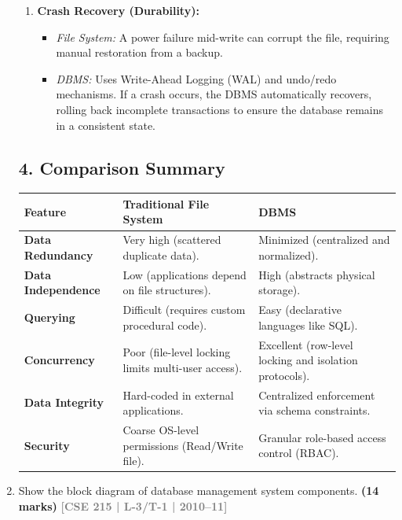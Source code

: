 \documentclass[12pt,a3paper]{article}
\newcommand{\yr}[1]{\hfill\textcolor{gray}{\small\textbf{[#1]}}}
\newcommand{\mk}[1]{\textcolor{orange!70!black}{\small\textbf{(#1 marks)}}}
\begin{document}
\begin{enumerate}
\begin{tcolorbox}[enhanced,breakable,ansbox,colback=cA!4,colframe=cA,boxrule=0.8pt,arc=5pt,title={\textbf{Answer}},fonttitle=\bfseries\color{white},colbacktitle=cA]
\begin{enumerate}
    \item \textbf{Crash Recovery (Durability):}
    \begin{itemize}
        \item \textit{File System:} A power failure mid-write can corrupt the file, requiring manual restoration from a backup.
        \item \textit{DBMS:} Uses Write-Ahead Logging (WAL) and undo/redo mechanisms. If a crash occurs, the DBMS automatically recovers, rolling back incomplete transactions to ensure the database remains in a consistent state.
    \end{itemize}
\end{enumerate}

\subsection*{4. Comparison Summary}

\begin{center}
\renewcommand{\arraystretch}{1.5}
\begin{tabularx}{\textwidth}{@{} >{\bfseries}l X X @{}}
\toprule
Feature & Traditional File System & DBMS \\
\midrule
Data Redundancy & Very high (scattered duplicate data). & Minimized (centralized and normalized). \\
Data Independence & Low (applications depend on file structures). & High (abstracts physical storage). \\
Querying & Difficult (requires custom procedural code). & Easy (declarative languages like SQL). \\
Concurrency & Poor (file-level locking limits multi-user access). & Excellent (row-level locking and isolation protocols). \\
Data Integrity & Hard-coded in external applications. & Centralized enforcement via schema constraints. \\
Security & Coarse OS-level permissions (Read/Write file). & Granular role-based access control (RBAC). \\
\bottomrule
\end{tabularx}
\end{center}


\end{tcolorbox}

\item Show the block diagram of database management system components.
\mk{14} \yr{CSE 215 | L-3/T-1 | 2010--11}


\end{enumerate}
\end{document}
